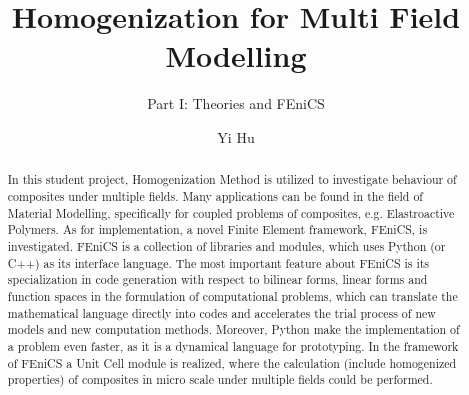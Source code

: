 \documentclass[10pt,a4paper]{scrartcl}
\author{Yi Hu}
\title{Homogenization for Multi Field Modelling}
\subtitle{Part I: Theories and FEniCS}
\begin{document}
\begin{abstract}
In this student project, Homogenization Method is utilized to investigate behaviour of composites under multiple fields. Many applications can be found in the field of Material Modelling, specifically for coupled problems of composites, e.g. Elastroactive Polymers. As for implementation, a novel Finite Element framework, FEniCS, is investigated. FEniCS is a collection of libraries and modules, which uses Python (or C++) as its interface language. The most important feature about FEniCS is its specialization in code generation with respect to bilinear forms, linear forms and function spaces in the formulation of computational problems, which can translate the mathematical language directly into codes and accelerates the trial process of new models and new computation methods. Moreover, Python make the implementation of a problem even faster, as it is a dynamical language for prototyping. In the framework of FEniCS a Unit Cell module is realized, where the calculation (include homogenized properties) of composites in micro scale under multiple fields could be performed.

\end{abstract}
\end{document}
